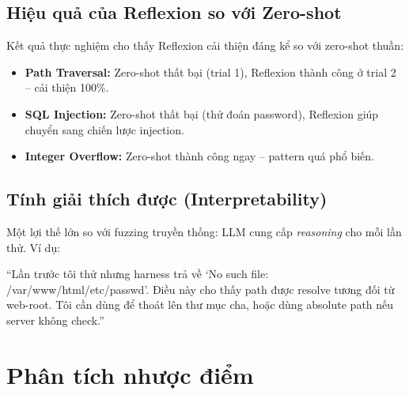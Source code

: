 \documentclass{nt521report}
\begin{document}
\subsection{Hiệu quả của Reflexion so với Zero-shot}

Kết quả thực nghiệm cho thấy Reflexion cải thiện đáng kể so với zero-shot thuần:
\begin{itemize}
  \item \textbf{Path Traversal:} Zero-shot thất bại (trial 1), Reflexion thành công ở trial 2 -- cải thiện 100\%.
  \item \textbf{SQL Injection:} Zero-shot thất bại (thử đoán password), Reflexion giúp chuyển sang chiến lược injection.
  \item \textbf{Integer Overflow:} Zero-shot thành công ngay -- pattern quá phổ biến.
\end{itemize}

\subsection{Tính giải thích được (Interpretability)}

Một lợi thế lớn so với fuzzing truyền thống: LLM cung cấp \textit{reasoning} cho mỗi lần thử. Ví dụ:

\begin{notebox}[title={Ví dụ reasoning của LLM (mô phỏng)}]
  ``Lần trước tôi thử  nhưng harness trả về `No such file: /var/www/html/etc/passwd'. Điều này cho thấy path được resolve tương đối từ web-root. Tôi cần dùng  để thoát lên thư mục cha, hoặc dùng absolute path  nếu server không check.''
\end{notebox}

\section{Phân tích nhược điểm}
\label{sec:disadvantages}
\end{document}
